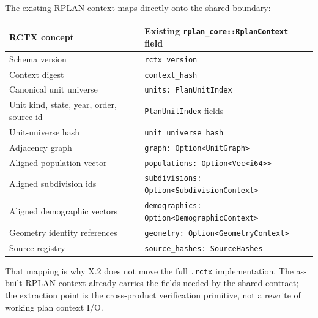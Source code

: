 The existing RPLAN context maps directly onto the shared boundary:

\begin{center}
\small
\begin{tabularx}{\textwidth}{lX}
\toprule
RCTX concept & Existing \texttt{rplan\_core::RplanContext} field \\
\midrule
Schema version & \texttt{rctx\_version} \\
Context digest & \texttt{context\_hash} \\
Canonical unit universe & \texttt{units: PlanUnitIndex} \\
Unit kind, state, year, order, source id & \texttt{PlanUnitIndex} fields \\
Unit-universe hash & \texttt{unit\_universe\_hash} \\
Adjacency graph & \texttt{graph: Option<UnitGraph>} \\
Aligned population vector & \texttt{populations: Option<Vec<i64>>} \\
Aligned subdivision ids & \texttt{subdivisions: Option<SubdivisionContext>} \\
Aligned demographic vectors & \texttt{demographics: Option<DemographicContext>} \\
Geometry identity references & \texttt{geometry: Option<GeometryContext>} \\
Source registry & \texttt{source\_hashes: SourceHashes} \\
\bottomrule
\end{tabularx}
\end{center}

That mapping is why X.2 does not move the full \texttt{.rctx} implementation.
The as-built RPLAN context already carries the fields needed by the shared
contract; the extraction point is the cross-product verification primitive, not
a rewrite of working plan context I/O.
